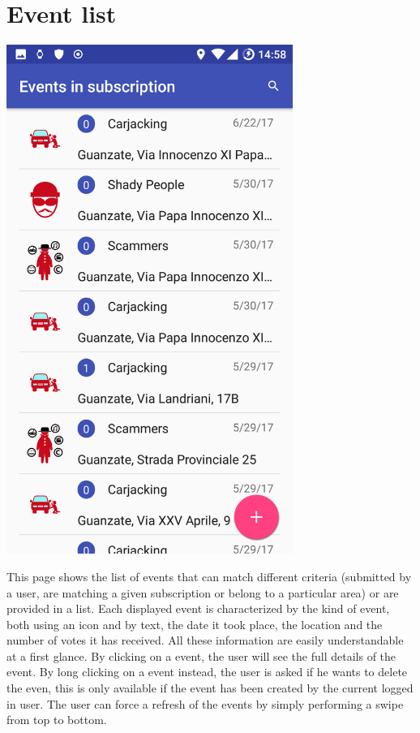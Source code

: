 \documentclass[a4paper]{scrreprt}
\begin{document}
\section{Event list}
\begin{minipage}{0.5\textwidth}
	\centering
	\includegraphics[width=0.7\textwidth]{imgs/event_list}
\end{minipage}
\begin{minipage}{0.5\textwidth}
	This page shows the list of events that can match different criteria (submitted by a user, are matching a given subscription or belong to a particular area) or are provided in a list. Each displayed event is characterized by the kind of event, both using an icon and by text, the date it took place, the location and the number of votes it has received. All these information are easily understandable at a first glance. By clicking on a event, the user will see the full details of the event. By long clicking on a event instead, the user is asked if he wants to delete the even, this is only available if the event has been created by the current logged in user. The user can force a refresh of the events by simply performing a swipe from top to bottom. 
\end{minipage}
\end{document}
